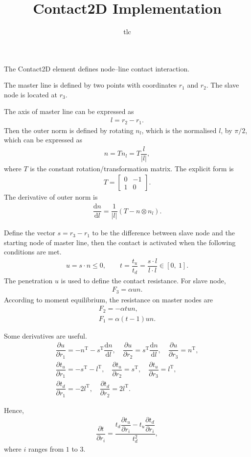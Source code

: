 \documentclass[10pt,fleqn,1p]{elsarticle}
\title{Contact2D Implementation}\date{}\author{tlc}
\newcommand*{\md}[1]{\mathrm{d}#1}
\newcommand*{\mT}{\mathrm{T}}
\newcommand*{\ddfrac}[2]{\dfrac{\md#1}{\md#2}}
\newcommand*{\pfrac}[2]{\dfrac{\partial#1}{\partial#2}}
\begin{document}
\pagestyle{empty}
The Contact2D element defines node--line contact interaction.

The master line is defined by two points with coordinates $r_1$ and $r_2$. The slave node is located at $r_3$.

The axis of master line can be expressed as
\begin{gather}
l=r_2-r_1.
\end{gather}
Then the outer norm is defined by rotating $n_l$, which is the normalised $l$, by $\pi/2$, which can be expressed as
\begin{gather}
n=Tn_l=T\dfrac{l}{|l|},
\end{gather}
where $T$ is the constant rotation/transformation matrix. The explicit form is
\begin{gather*}
T=\begin{bmatrix}
0&-1\\1&0
\end{bmatrix}.
\end{gather*}
The derivative of outer norm is
\begin{gather}
\ddfrac{n}{l}=\dfrac{1}{|l|}\left(T-n\otimes{}n_l\right).
\end{gather}

Define the vector $s=r_3-r_1$ to be the difference between slave node and the starting node of master line, then the contact is activated when the following conditions are met.
\begin{gather}
u=s\cdot{}n\leqslant0,\qquad{}t=\dfrac{t_u}{t_d}=\dfrac{s\cdot{}l}{l\cdot{}l}\in[0,~1].
\end{gather}
The penetration $u$ is used to define the contact resistance. For slave node,
\begin{gather}
F_3=\alpha{}un.
\end{gather}
According to moment equilibrium, the resistance on master nodes are
\begin{gather}
F_2=-\alpha{}tun,\\
F_1=\alpha\left(t-1\right)un.
\end{gather}

Some derivatives are useful.
\begin{gather}
\pfrac{u}{r_1}=-n^\mT-s^\mT\ddfrac{n}{l},\quad
\pfrac{u}{r_2}=s^\mT\ddfrac{n}{l},\quad
\pfrac{u}{r_3}=n^\mT,\\
\pfrac{t_u}{r_1}=-s^\mT-l^\mT,\quad
\pfrac{t_u}{r_2}=s^\mT,\quad
\pfrac{t_u}{r_3}=l^\mT,\\
\pfrac{t_d}{r_1}=-2l^\mT,\quad
\pfrac{t_d}{r_2}=2l^\mT.
\end{gather}

Hence,
\begin{gather}
\pfrac{t}{r_i}=\dfrac{t_d\pfrac{t_u}{r_i}-t_u\pfrac{t_d}{r_i}}{t_d^2},
\end{gather}
where $i$ ranges from $1$ to $3$.
\end{document}

